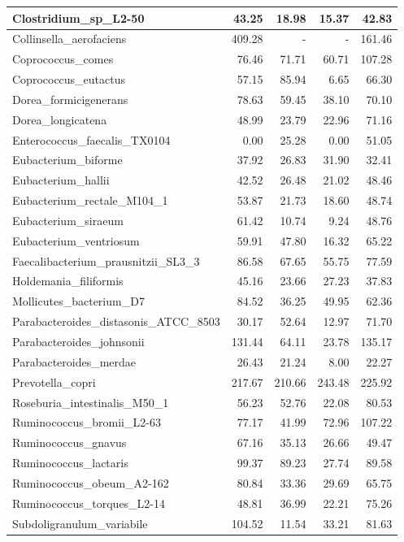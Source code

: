 \documentclass[12pt,a4paper]{article}
\begin{document}
\begin{table}[ht]
\begin{center}
\begin{tabular}{|l*{4}{|r}|}
Clostridium\_sp\_L2-50 & 43.25 & 18.98 & 15.37 & 42.83 \\ \hline
Collinsella\_aerofaciens & 409.28 & - & - & 161.46 \\ \hline
Coprococcus\_comes & 76.46 & 71.71 & 60.71 & 107.28 \\ \hline
Coprococcus\_eutactus & 57.15 & 85.94 & 6.65 & 66.30 \\ \hline
Dorea\_formicigenerans & 78.63 & 59.45 & 38.10 & 70.10 \\ \hline
Dorea\_longicatena & 48.99 & 23.79 & 22.96 & 71.16 \\ \hline
Enterococcus\_faecalis\_TX0104 & 0.00 & 25.28 & 0.00 & 51.05 \\ \hline
Eubacterium\_biforme & 37.92 & 26.83 & 31.90 & 32.41 \\ \hline
Eubacterium\_hallii & 42.52 & 26.48 & 21.02 & 48.46 \\ \hline
Eubacterium\_rectale\_M104\_1 & 53.87 & 21.73 & 18.60 & 48.74 \\ \hline
Eubacterium\_siraeum & 61.42 & 10.74 & 9.24 & 48.76 \\ \hline
Eubacterium\_ventriosum & 59.91 & 47.80 & 16.32 & 65.22 \\ \hline
Faecalibacterium\_prausnitzii\_SL3\_3 & 86.58 & 67.65 & 55.75 & 77.59 \\ \hline
Holdemania\_filiformis & 45.16 & 23.66 & 27.23 & 37.83 \\ \hline
Mollicutes\_bacterium\_D7 & 84.52 & 36.25 & 49.95 & 62.36 \\ \hline
Parabacteroides\_distasonis\_ATCC\_8503 & 30.17 & 52.64 & 12.97 & 71.70 \\ \hline
Parabacteroides\_johnsonii & 131.44 & 64.11 & 23.78 & 135.17 \\ \hline
Parabacteroides\_merdae & 26.43 & 21.24 & 8.00 & 22.27 \\ \hline
Prevotella\_copri & 217.67 & 210.66 & 243.48 & 225.92 \\ \hline
Roseburia\_intestinalis\_M50\_1 & 56.23 & 52.76 & 22.08 & 80.53 \\ \hline
Ruminococcus\_bromii\_L2-63 & 77.17 & 41.99 & 72.96 & 107.22 \\ \hline
Ruminococcus\_gnavus & 67.16 & 35.13 & 26.66 & 49.47 \\ \hline
Ruminococcus\_lactaris & 99.37 & 89.23 & 27.74 & 89.58 \\ \hline
Ruminococcus\_obeum\_A2-162 & 80.84 & 33.36 & 29.69 & 65.75 \\ \hline
Ruminococcus\_torques\_L2-14 & 48.81 & 36.99 & 22.21 & 75.26 \\ \hline
Subdoligranulum\_variabile & 104.52 & 11.54 & 33.21 & 81.63 \\ \hline
\end{tabular}
\end{center}
\end{table}
\end{document}

